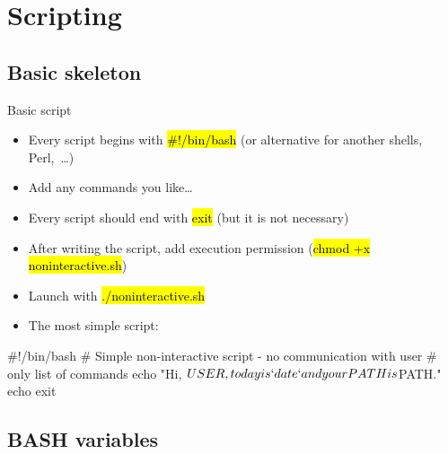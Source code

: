 \documentclass[compress, ucs, xelatex, 11pt, xcolor=svgnames,
  hyperref={
    bookmarks=true,
    unicode=true,
    colorlinks=true,
    pdftitle={Linux, command line and MetaCentrum},
    plainpages=false,
    pdfauthor={Vojtech Zeisek},
    pdfsubject={Course about use of Linux command line, writing shell scripts and using MetaCentrum of CESNET},
    pdfcreator={XeLaTeX},
    pdfkeywords={Linux, GNU, BASH, shell, command line, MetaCentrum},
    linkcolor=DarkRed,
    anchorcolor=DarkBlue,
    citecolor=Indigo,
    filecolor=NavyBlue,
    menucolor=DarkMagenta,
    urlcolor=DarkBlue,
    pdftex},
  url={hyphens, lowtilde} %
  ]{beamer}
\renewcommand{\texttt}[1]{\hl{\ttfamily #1}}
\begin{document}
\section{Scripting}

\subsection{Basic skeleton}

\begin{frame}[fragile]{Basic script}
  \begin{itemize}
    \item Every script begins with \texttt{\#!/bin/bash} (or alternative for another shells, Perl,~\ldots)
    \item Add any commands you like\ldots
    \item Every script should end with \texttt{exit} (but it is not necessary)
    \item After writing the script, add execution permission (\texttt{chmod +x noninteractive.sh})
    \item Launch with \texttt{./noninteractive.sh}
    \item The most simple script:
  \end{itemize}
  \begin{bashcode}
    #!/bin/bash
    # Simple non-interactive script - no communication with user
    # only list of commands
    echo "Hi, $USER, today is `date` and your PATH is $PATH."
    echo
    exit
  \end{bashcode}
\end{frame}

\subsection{BASH variables}
\end{document}
